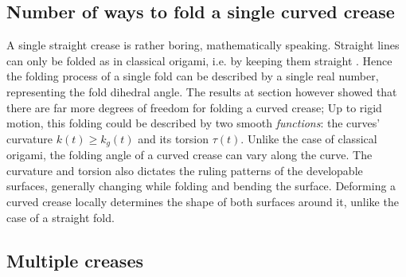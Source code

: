 \subsection{Number of ways to fold a single curved crease}
A single straight crease is rather boring, mathematically speaking. Straight lines can only be folded as in classical origami, i.e. by keeping them straight \cite{demaine_lens}. Hence the folding process of a single fold can be described by a single real number, representing the fold dihedral angle. The results at section  however showed that there are far more degrees of freedom for folding a curved crease; Up to rigid motion, this folding could be described by two smooth \textit{functions}: the curves' curvature $k(t) \geq k_g(t)$ and its torsion $\tau(t)$. Unlike the case of classical origami, the folding angle of a curved crease can vary along the curve. The curvature and torsion also dictates the ruling patterns of the developable surfaces, generally changing while folding and bending the surface. Deforming a curved crease locally determines the shape of both surfaces around it, unlike the case of a straight fold. %

\subsection{Multiple creases}
